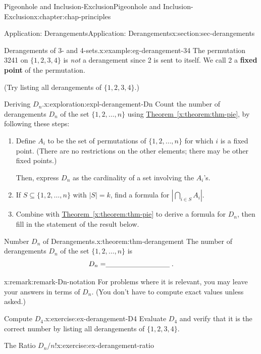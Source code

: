 \documentclass[oneside,10pt,]{book}
\newcommand{\xreffont}{\relax}
\newcommand{\terminology}[1]{\textbf{#1}}
\newcommand{\fillin}[1]{\leavevmode\leaders\vrule height -1.2pt depth 1.5pt \hskip #1em minus #1em \null}
\numberwithin{equation}{section}
\begin{document}
\begin{chapterptx}{Pigeonhole and Inclusion-Exclusion}{}{Pigeonhole and Inclusion-Exclusion}{}{}{x:chapter:chap-principles}
\begin{sectionptx}{Application: Derangements}{}{Application: Derangements}{}{}{x:section:sec-derangements}
\begin{example}{Derangements of 3- and 4-sets.}{x:example:eg-derangement-34}
The permutation 3241 on \(\{1,2,3,4\}\) is \emph{not} a derangement since 2 is sent to itself. We call 2 a \terminology{fixed point} of the permutation.%
\par
(Try listing all derangements of \(\{1,2,3,4\}\).)%
\end{example}
\begin{exploration}{Deriving \(D_n\).}{x:exploration:expl-derangement-Dn}%
Count the number of derangements \(D_n\) of the set \(\{1,2,\ldots,n\}\) using \hyperref[x:theorem:thm-pie]{Theorem~{\xreffont\ref{x:theorem:thm-pie}}}, by following these steps: \label{g:notation:id534591}%
\begin{enumerate}[font=\bfseries,label=(\alph*),ref=\alph*]
\item{}Define \(A_i\) to be the set of permutations of \(\{1,2,\ldots,n\}\) for which \(i\) is a fixed point. (There are no restrictions on the other elements; there may be other fixed points.)%
\par
Then, express \(D_n\) as the cardinality of a set involving the \(A_i\)'s.%
\item{}If \(S \subseteq \{1,2,\ldots,n\}\) with \(|S| = k\), find a formula for \(\left|\displaystyle\bigcap_{i \in S} A_i\right|\).%
\item{}Combine with \hyperref[x:theorem:thm-pie]{Theorem~{\xreffont\ref{x:theorem:thm-pie}}} to derive a formula for \(D_n\), then fill in the statement of the result below.%
\end{enumerate}
\end{exploration}%
\begin{theorem}{Number \(D_n\) of Derangements.}{}{x:theorem:thm-derangement}%
The number of derangements \(D_n\) of the set \(\{1,2,\ldots,n\}\) is%
\begin{equation*}
D_n = \fillin{9.090909090909092}\text{.}
\end{equation*}
%
\end{theorem}
\begin{remark}{}{x:remark:remark-Dn-notation}%
For problems where it is relevant, you may leave your answers in terms of \(D_n\). (You don't have to compute exact values unless asked.)%
\end{remark}
\begin{inlineexercise}{Compute \(D_4\).}{x:exercise:ex-derangement-D4}%
Evaluate \(D_4\) and verify that it is the correct number by listing all derangements of \(\{1,2,3,4\}\).%
\end{inlineexercise}%
\begin{inlineexercise}{The Ratio \(D_n/n!\)}{x:exercise:ex-derangement-ratio}%

\end{inlineexercise}
\end{sectionptx}
\end{chapterptx}
\end{document}
